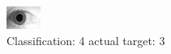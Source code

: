 \begin{figure}[h!]
\begin{center}
\includegraphics[width=0.60\columnwidth]{figures/ID1925_class_4_target_3.png}
\end{center}
\caption{ Classification: 4 actual target: 3}
\label{fig:ID1925_class_4_target_3}
\end{figure}
